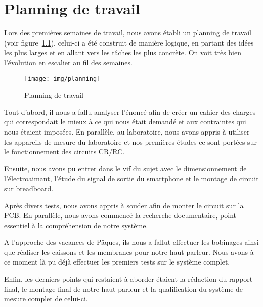 \chapter{Planning de travail}
\label{annexe:planning}

Lors des premières semaines de travail, nous avons établi un planning de travail (voir figure~\ref{fig:plan}), celui-ci a été construit de manière logique, en partant des idées les plus larges et en allant vers les tâches les plus concrète. On voit très bien l'évolution en escalier au fil des semaines.

\begin{figure}	
\begin{center}
\texttt{[image: img/planning]} 
\end{center}
\caption{Planning de travail}		
\label{fig:plan}		
\end{figure}

Tout d'abord, il nous a fallu analyser l'énoncé afin de créer un cahier des charges qui correspondait le mieux à ce qui nous était demandé et aux contraintes qui nous étaient imposées. 
En parallèle, au laboratoire, nous avons appris à utiliser les appareils de mesure du laboratoire et nos premières études ce sont portées sur le fonctionnement des circuits CR/RC.

Ensuite, nous avons pu entrer dans le vif du sujet avec le dimensionnement de l'électroaimant, l'étude du signal de sortie du smartphone et le montage de circuit sur breadboard.

Après divers tests, nous avons appris à souder afin de monter le circuit sur la PCB. En parallèle, nous avons commencé la recherche documentaire, point essentiel à la compréhension de notre système.

A l'approche des vacances de Pâques, ils nous a fallut effectuer les bobinages ainsi que réaliser les caissons et les membranes pour notre haut-parleur. Nous avons à ce moment là pu déjà effectuer les premiers tests sur le système complet.

Enfin, les derniers points qui restaient à aborder étaient la rédaction du rapport final, le montage final de notre haut-parleur et la qualification du système de mesure complet de celui-ci.

